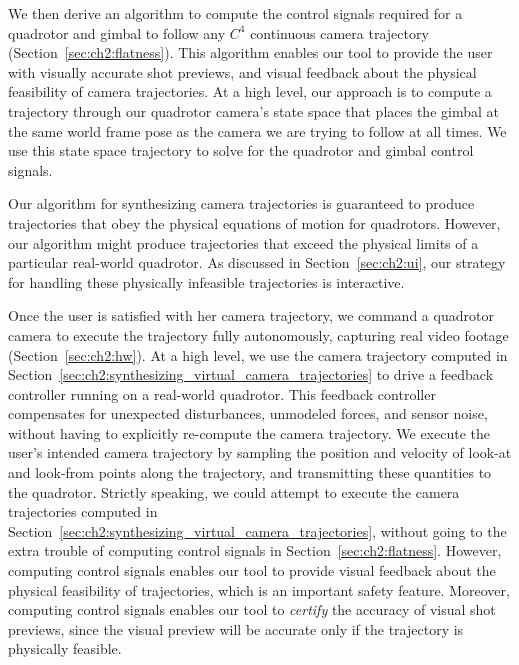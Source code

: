We then derive an algorithm to compute the control signals required for a quadrotor and gimbal to follow any $C^4$ continuous camera trajectory (Section~\ref{sec:ch2:flatness}).
This algorithm enables our tool to provide the user with visually accurate shot previews, and visual feedback about the physical feasibility of camera trajectories.
At a high level, our approach is to compute a trajectory through our quadrotor camera's state space that places the gimbal at the same world frame pose as the camera we are trying to follow at all times.
We use this state space trajectory to solve for the quadrotor and gimbal control signals.

Our algorithm for synthesizing camera trajectories is guaranteed to produce trajectories that obey the physical equations of motion for quadrotors.
However, our algorithm might produce trajectories that exceed the physical limits of a particular real-world quadrotor.
As discussed in Section~\ref{sec:ch2:ui}, our strategy for handling these physically infeasible trajectories is interactive.

Once the user is satisfied with her camera trajectory, we command a quadrotor camera to execute the trajectory fully autonomously, capturing real video footage (Section~\ref{sec:ch2:hw}).
At a high level, we use the camera trajectory computed in Section~\ref{sec:ch2:synthesizing_virtual_camera_trajectories} to drive a feedback controller running on a real-world quadrotor.
This feedback controller compensates for unexpected disturbances, unmodeled forces, and sensor noise, without having to explicitly re-compute the camera trajectory.
We execute the user's intended camera trajectory by sampling the position and velocity of look-at and look-from points along the trajectory, and transmitting these quantities to the quadrotor.
Strictly speaking, we could attempt to execute the camera trajectories computed in Section~\ref{sec:ch2:synthesizing_virtual_camera_trajectories}, without going to the extra trouble of  computing control signals  in Section~\ref{sec:ch2:flatness}.
However, computing control signals enables our tool to provide visual feedback about the physical feasibility of trajectories, which is an important safety feature. Moreover, computing control signals enables our tool to \emph{certify} the accuracy of visual shot previews, since the visual preview will be accurate only if the trajectory is physically feasible.


